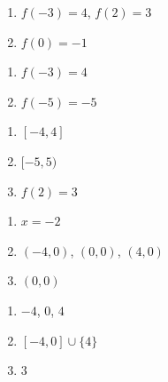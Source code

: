 \begin{multicols}{2}
\begin{enumerate}
\setcounter{enumi}{\value{HW}}

\item  $f(-3) = 4$, $f(2) = 3$
\item  $f(0) = -1$

\setcounter{HW}{\value{enumi}}
\end{enumerate}
\end{multicols}

\begin{multicols}{2}
\begin{enumerate}
\setcounter{enumi}{\value{HW}}

\item  $f(-3) = 4$
\item  $f(-5) = -5$

\setcounter{HW}{\value{enumi}}
\end{enumerate}
\end{multicols}

\begin{multicols}{3}
\begin{enumerate}
\setcounter{enumi}{\value{HW}}

\item  $[-4,4]$ 
\item  $[-5,5)$
\item  $f(2) = 3$

\setcounter{HW}{\value{enumi}}
\end{enumerate}
\end{multicols}

\begin{multicols}{3}
\begin{enumerate}
\setcounter{enumi}{\value{HW}}

\item  $x=-2$
\item $(-4,0)$, $(0,0)$, $(4,0)$
\item  $(0,0)$

\setcounter{HW}{\value{enumi}}
\end{enumerate}
\end{multicols}

\begin{multicols}{3}
\begin{enumerate}
\setcounter{enumi}{\value{HW}}

\item  $-4$, $0$, $4$
\item  $[-4,0] \cup \{4\}$
\item  $3$

\setcounter{HW}{\value{enumi}}
\end{enumerate}
\end{multicols}

